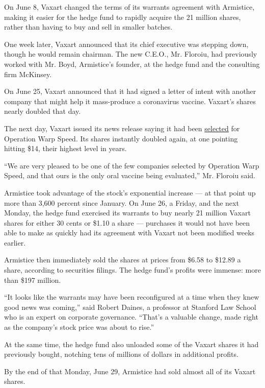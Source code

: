 On June 8, Vaxart changed the terms of its warrants agreement with
Armistice, making it easier for the hedge fund to rapidly acquire the 21
million shares, rather than having to buy and sell in smaller batches.

One week later, Vaxart announced that its chief executive was stepping
down, though he would remain chairman. The new C.E.O., Mr. Floroiu, had
previously worked with Mr. Boyd, Armistice's founder, at the hedge fund
and the consulting firm McKinsey.

On June 25, Vaxart announced that it had signed a letter of intent with
another company that might help it mass-produce a coronavirus vaccine.
Vaxart's shares nearly doubled that day.

The next day, Vaxart issued its news release saying it had been
\href{https://investors.vaxart.com/news-releases/news-release-details/vaxarts-covid-19-vaccine-selected-us-governments-operation-warp}{selected}
for Operation Warp Speed. Its shares instantly doubled again, at one
pointing hitting \$14, their highest level in years.

``We are very pleased to be one of the few companies selected by
Operation Warp Speed, and that ours is the only oral vaccine being
evaluated,'' Mr. Floroiu said.

Armistice took advantage of the stock's exponential increase --- at that
point up more than 3,600 percent since January. On June 26, a Friday,
and the next Monday, the hedge fund exercised its warrants to buy nearly
21 million Vaxart shares for either 30 cents or \$1.10 a share ---
purchases it would not have been able to make as quickly had its
agreement with Vaxart not been modified weeks earlier.

Armistice then immediately sold the shares at prices from \$6.58 to
\$12.89 a share, according to securities filings. The hedge fund's
profits were immense: more than \$197 million.

``It looks like the warrants may have been reconfigured at a time when
they knew good news was coming,'' said Robert Daines, a professor at
Stanford Law School who is an expert on corporate governance. ``That's a
valuable change, made right as the company's stock price was about to
rise.''

At the same time, the hedge fund also unloaded some of the Vaxart shares
it had previously bought, notching tens of millions of dollars in
additional profits.

By the end of that Monday, June 29, Armistice had sold almost all of its
Vaxart shares.


